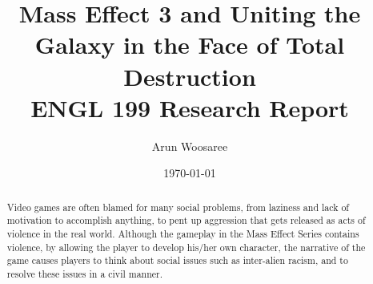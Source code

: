 \documentclass[journal]{IEEEtran}
\title{Mass Effect 3 and Uniting the Galaxy in the Face of Total Destruction\\
\vspace{.25cm}\large ENGL 199 Research Report \vspace{-.5cm}}
\author{\Huge Arun Woosaree}
\date{\today}
\begin{document}
\maketitle %
\begin{abstract}
 Video games are often blamed for many social problems,
 from laziness and lack of motivation to accomplish anything, to pent up aggression that gets released as acts of violence in the real world. Although the gameplay in the Mass Effect Series contains violence, by allowing the player to develop his/her own character, the narrative of the game causes players to think about social issues such as inter-alien racism, and to resolve these issues in a civil manner.
\end{abstract}
\end{document}
